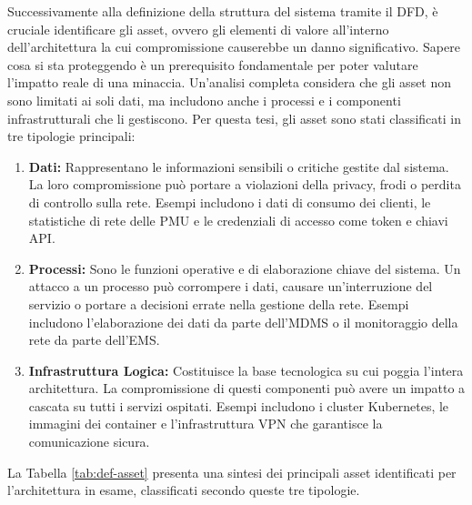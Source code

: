 



Successivamente alla definizione della struttura del sistema tramite il DFD, è cruciale identificare gli asset, ovvero gli elementi di valore all'interno dell'architettura la cui compromissione causerebbe un danno significativo. Sapere cosa si sta proteggendo è un prerequisito fondamentale per poter valutare l'impatto reale di una minaccia.
Un'analisi completa considera che gli asset non sono limitati ai soli dati, ma includono anche i processi e i componenti infrastrutturali che li gestiscono. Per questa tesi, gli asset sono stati classificati in tre tipologie principali:

\begin{enumerate}
    \item \textbf{Dati:} Rappresentano le informazioni sensibili o critiche gestite dal sistema. La loro compromissione può portare a violazioni della privacy, frodi o perdita di controllo sulla rete. Esempi includono i dati di consumo dei clienti, le statistiche di rete delle PMU e le credenziali di accesso come token e chiavi API.
    \item \textbf{Processi:} Sono le funzioni operative e di elaborazione chiave del sistema. Un attacco a un processo può corrompere i dati, causare un'interruzione del servizio o portare a decisioni errate nella gestione della rete. Esempi includono l'elaborazione dei dati da parte dell'MDMS o il monitoraggio della rete da parte dell'EMS.
    \item \textbf{Infrastruttura Logica:} Costituisce la base tecnologica su cui poggia l'intera architettura. La compromissione di questi componenti può avere un impatto a cascata su tutti i servizi ospitati. Esempi includono i cluster Kubernetes, le immagini dei container e l'infrastruttura VPN che garantisce la comunicazione sicura.
\end{enumerate}

La Tabella \ref{tab:def-asset} presenta una sintesi dei principali asset identificati per l'architettura in esame, classificati secondo queste tre tipologie.

